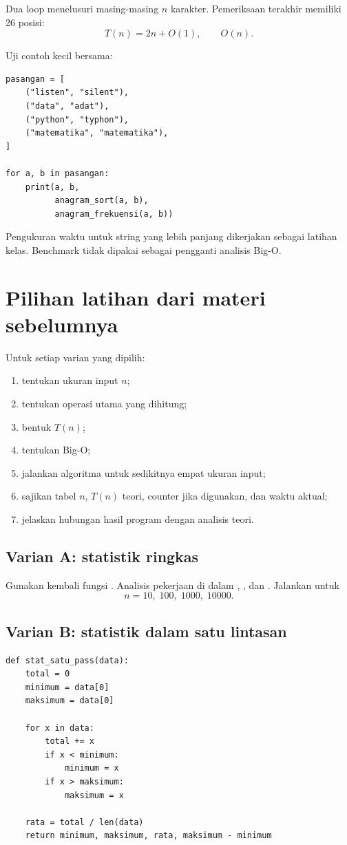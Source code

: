\documentclass[11pt,a4paper]{report}
\newcommand{\kode}[1]{\texttt{\detokenize{#1}}}
\begin{document}
Dua loop menelusuri masing-masing $n$ karakter. Pemeriksaan terakhir memiliki 26 posisi:
\[
T(n)=2n+O(1),
\qquad
O(n).
\]

Uji contoh kecil bersama:

\begin{lstlisting}
pasangan = [
    ("listen", "silent"),
    ("data", "adat"),
    ("python", "typhon"),
    ("matematika", "matematika"),
]

for a, b in pasangan:
    print(a, b,
          anagram_sort(a, b),
          anagram_frekuensi(a, b))
\end{lstlisting}

Pengukuran waktu untuk string yang lebih panjang dikerjakan sebagai latihan kelas.
Benchmark tidak dipakai sebagai pengganti analisis Big-O.

\section{Pilihan latihan dari materi sebelumnya}

Untuk setiap varian yang dipilih:
\begin{enumerate}
  \item tentukan ukuran input $n$;
  \item tentukan operasi utama yang dihitung;
  \item bentuk $T(n)$;
  \item tentukan Big-O;
  \item jalankan algoritma untuk sedikitnya empat ukuran input;
  \item sajikan tabel $n$, $T(n)$ teori, counter jika digunakan, dan waktu aktual;
  \item jelaskan hubungan hasil program dengan analisis teori.
\end{enumerate}

\subsection*{Varian A: statistik ringkas}

Gunakan kembali fungsi \kode{stat_ringkas}. Analisis pekerjaan di dalam \kode{min},
\kode{max}, dan \kode{sum}. Jalankan untuk
\[
n=10,\;100,\;1000,\;10000.
\]

\subsection*{Varian B: statistik dalam satu lintasan}

\begin{lstlisting}
def stat_satu_pass(data):
    total = 0
    minimum = data[0]
    maksimum = data[0]

    for x in data:
        total += x
        if x < minimum:
            minimum = x
        if x > maksimum:
            maksimum = x

    rata = total / len(data)
    return minimum, maksimum, rata, maksimum - minimum
\end{lstlisting}
\end{document}

